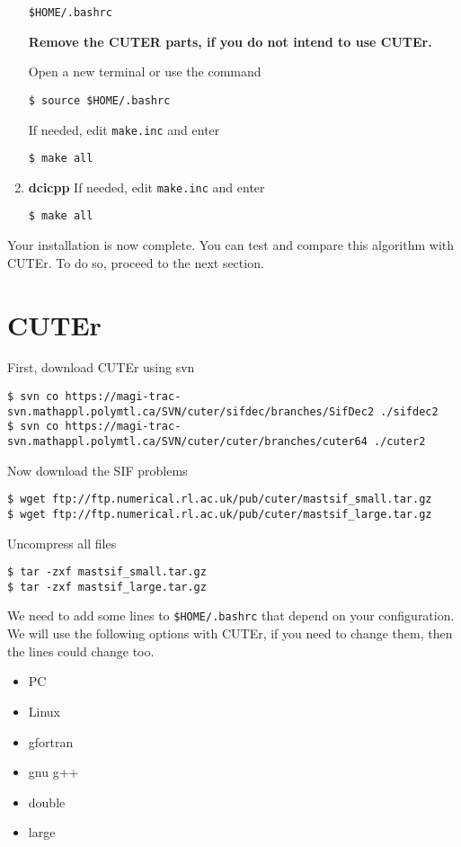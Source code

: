 \documentclass[letterpaper,11pt]{article}
\numberwithin{equation}{section}
\newcommand{\makesec}[1]{\section[#1]{#1}}
\begin{document}
\begin{enumerate}
\verb+$HOME/.bashrc+

{\bf Remove the CUTER parts, if you do not intend to use CUTEr. }

Open a new terminal or use the command
\begin{verbatim}
$ source $HOME/.bashrc
\end{verbatim}
If needed, edit \verb+make.inc+ and enter
\begin{verbatim}
$ make all
\end{verbatim}
   \item {\bf dcicpp} If needed, edit \verb+make.inc+ and enter
\begin{verbatim}
$ make all
\end{verbatim}
\end{enumerate}

Your installation is now complete. You can test and compare this algorithm with CUTEr. To do so, proceed to the next section.

\makesec{CUTEr}
First, download CUTEr using svn
\small
\begin{verbatim}
$ svn co https://magi-trac-svn.mathappl.polymtl.ca/SVN/cuter/sifdec/branches/SifDec2 ./sifdec2
$ svn co https://magi-trac-svn.mathappl.polymtl.ca/SVN/cuter/cuter/branches/cuter64 ./cuter2
\end{verbatim}
\normalsize
Now download the SIF problems
\begin{verbatim}
$ wget ftp://ftp.numerical.rl.ac.uk/pub/cuter/mastsif_small.tar.gz
$ wget ftp://ftp.numerical.rl.ac.uk/pub/cuter/mastsif_large.tar.gz
\end{verbatim}
Uncompress all files
\begin{verbatim}
$ tar -zxf mastsif_small.tar.gz
$ tar -zxf mastsif_large.tar.gz
\end{verbatim}
We need to add some lines to \verb+$HOME/.bashrc+ that depend on your configuration.
We will use the following options with CUTEr, if you need to change them, then the lines could change too.
\begin{itemize}
\item PC
\item Linux
\item gfortran
\item gnu g++
\item double
\item large
\end{itemize}
\end{document}

